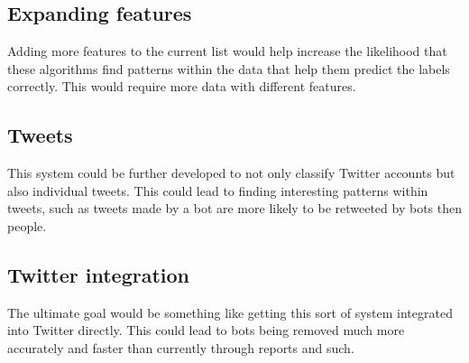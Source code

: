 \subsection{Expanding features}
Adding more features to the current list would help increase the likelihood that these algorithms find patterns within the data that help them predict the labels correctly. This would require more data with different features.

\subsection{Tweets}
This system could be further developed to not only classify Twitter accounts but also individual tweets. This could lead to finding interesting patterns within tweets, such as tweets made by a bot are more likely to be retweeted by bots then people.

\subsection{Twitter integration}
The ultimate goal would be something like getting this sort of system integrated into Twitter directly. This could lead to bots being removed much more accurately and faster than currently through reports and such.




